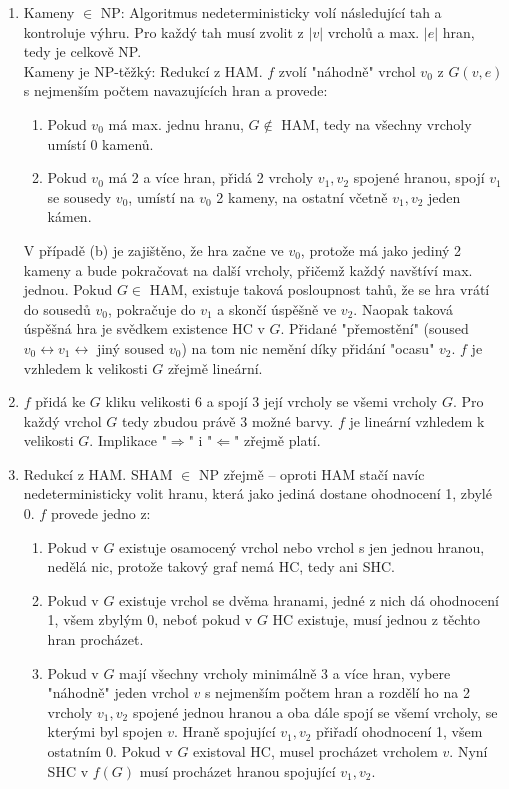\documentclass[a4wide,10pt]{extarticle}
\begin{document}
\begin{enumerate}
\begin{itemize}
		\end{itemize}
	\item
		Kameny $\in$ NP: Algoritmus nedeterministicky volí následující tah a kontroluje výhru. Pro každý tah musí zvolit z $|v|$ vrcholů a max. $|e|$ hran, tedy je celkově NP.\\
		Kameny je NP-těžký: Redukcí z HAM. $f$ zvolí "náhodně" vrchol $v_0$ z $G(v,e)$ s nejmenším počtem navazujících hran a provede:
		\begin{enumerate}
			\item Pokud $v_0$ má max. jednu hranu, $G\not\in $ HAM, tedy na všechny vrcholy umístí 0 kamenů.
			\item Pokud $v_0$ má 2 a více hran, přidá 2 vrcholy $v_1,v_2$ spojené hranou, spojí $v_1$ se sousedy $v_0$, umístí na $v_0$ 2 kameny, na ostatní včetně $v_1,v_2$ jeden kámen.
		\end{enumerate}
		V případě (b) je zajištěno, že hra začne ve $v_0$, protože má jako jediný 2 kameny a bude pokračovat na další vrcholy, přičemž každý navštíví max. jednou. Pokud $G\in$ HAM, existuje taková posloupnost tahů, že se  hra vrátí do sousedů $v_0$, pokračuje do $v_1$ a skončí úspěšně ve $v_2$. Naopak taková úspěšná hra je svědkem existence HC v $G$. Přidané "přemostění" (soused $v_0\leftrightarrow v_1 \leftrightarrow $ jiný soused $v_0$) na tom nic nemění díky přidání "ocasu" $v_2$. $f$ je vzhledem k velikosti $G$ zřejmě lineární.
	\item
		$f$ přidá ke $G$ kliku velikosti 6 a spojí 3 její vrcholy se všemi vrcholy $G$. Pro každý vrchol $G$ tedy zbudou právě 3 možné barvy. $f$ je lineární vzhledem k velikosti $G$. Implikace "$\Rightarrow$" i "$\Leftarrow$" zřejmě platí.
	\item
		Redukcí z HAM. SHAM $\in$ NP zřejmě -- oproti HAM stačí navíc nedeterministicky volit hranu, která jako jediná dostane ohodnocení 1, zbylé 0. $f$ provede jedno z:
		\begin{enumerate}
			\item Pokud v $G$ existuje osamocený vrchol nebo vrchol s jen jednou hranou, nedělá nic, protože takový graf nemá HC, tedy ani SHC.
			\item Pokud v $G$ existuje vrchol se dvěma hranami, jedné z nich dá ohodnocení 1, všem zbylým 0, neboť pokud v $G$ HC existuje, musí jednou z těchto hran procházet.
			\item Pokud v $G$ mají všechny vrcholy minimálně 3 a více hran, vybere "náhodně" jeden vrchol $v$ s nejmenším počtem hran a rozdělí ho na 2 vrcholy $v_1, v_2$ spojené jednou hranou a oba dále spojí se všemí vrcholy, se kterými byl spojen $v$. Hraně spojující $v_1, v_2$ přiřadí ohodnocení 1, všem ostatním 0. Pokud v $G$ existoval HC, musel procházet vrcholem $v$. Nyní SHC v $f(G)$ musí procházet hranou spojující $v_1, v_2$.

\end{enumerate}
\end{enumerate}
\end{document}
